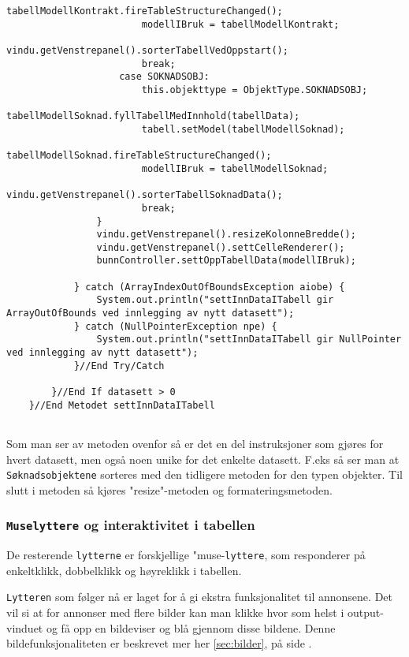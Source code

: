 \begin{lstlisting}[caption=Metoden \texttt{settInnDataITabell} i \texttt{ControllerTabell.java}]
                        tabellModellKontrakt.fireTableStructureChanged();
                        modellIBruk = tabellModellKontrakt;
                        vindu.getVenstrepanel().sorterTabellVedOppstart();
                        break;
                    case SOKNADSOBJ:
                        this.objekttype = ObjektType.SOKNADSOBJ;
                        tabellModellSoknad.fyllTabellMedInnhold(tabellData);
                        tabell.setModel(tabellModellSoknad);
                        tabellModellSoknad.fireTableStructureChanged();
                        modellIBruk = tabellModellSoknad;
                        vindu.getVenstrepanel().sorterTabellSoknadData();
                        break;
                }
                vindu.getVenstrepanel().resizeKolonneBredde();
                vindu.getVenstrepanel().settCelleRenderer();
                bunnController.settOppTabellData(modellIBruk);

            } catch (ArrayIndexOutOfBoundsException aiobe) {
                System.out.println("settInnDataITabell gir ArrayOutOfBounds ved innlegging av nytt datasett");
            } catch (NullPointerException npe) {
                System.out.println("settInnDataITabell gir NullPointer ved innlegging av nytt datasett");
            }//End Try/Catch

        }//End If datasett > 0
    }//End Metodet settInnDataITabell
        
\end{lstlisting}

Som man ser av metoden ovenfor så er det en del instruksjoner som gjøres for hvert datasett, men også noen unike for det enkelte datasett. F.eks så ser man at \texttt{Søknadsobjektene} sorteres med den tidligere metoden for den typen objekter. Til slutt i metoden så kjøres "resize"-metoden og formateringsmetoden. 

\subsubsection{\texttt{Muselyttere} og interaktivitet i tabellen} \label{sec:interaktivitettabell}

De resterende \texttt{lytterne} er forskjellige "muse-\texttt{lyttere}, som responderer på enkeltklikk, dobbelklikk og høyreklikk i tabellen.


\texttt{Lytteren} som følger nå er laget for å gi ekstra funksjonalitet til annonsene. Det vil si at for annonser med flere bilder kan man klikke hvor som helst i output-vinduet og få opp en bildeviser og blå gjennom disse bildene. Denne bildefunksjonaliteten er beskrevet mer her \ref{sec:bilder}, på side \pageref{sec:bilder}.

